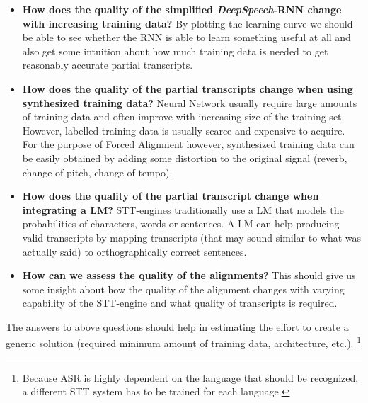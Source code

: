 \begin{itemize}
	\item \textbf{How does the quality of the simplified \textit{DeepSpeech}-\ac{RNN} change with increasing training data?} By plotting the learning curve we should be able to see whether the RNN is able to learn something useful at all and also get some intuition about how much training data is needed to get reasonably accurate partial transcripts.
	\item \textbf{How does the quality of the partial transcripts change when using synthesized training data?} Neural Network usually require large amounts of training data and often improve with increasing size of the training set. However, labelled training data is usually scarce and expensive to acquire. For the purpose of Forced Alignment however, synthesized training data can be easily obtained by adding some distortion to the original signal (reverb, change of pitch, change of tempo).
	\item \textbf{How does the quality of the partial transcript change when integrating a \ac{LM}?} \ac{STT}-engines traditionally use a \ac{LM} that models the probabilities of characters, words or sentences. A \ac{LM} can help producing valid transcripts by mapping transcripts (that may sound similar to what was actually said) to orthographically correct sentences.
	\item \textbf{How can we assess the quality of the alignments?} This should give us some insight about how the quality of the alignment changes with varying capability of the \ac{STT}-engine and what quality of transcripts is required.
\end{itemize}

The answers to above questions should help in estimating the effort to create a generic solution (required minimum amount of training data, architecture, etc.). \footnote{Because \ac{ASR} is highly dependent on the language that should be recognized, a different \ac{STT} system has to be trained for each language.}

